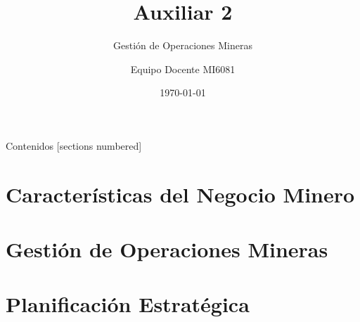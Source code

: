 \documentclass[10pt]{beamer}
\title{Auxiliar 2}
\subtitle{Gestión de Operaciones Mineras}
\date{\today}
\author{Equipo Docente MI6081}
\institute{Universidad de Chile - FCFM}
\begin{document}
\maketitle

\begin{frame}[allowframebreaks]{Contenidos}
  [sections numbered]
  \tableofcontents[hideallsubsections]
\end{frame}

\section{Características del Negocio Minero}

\section{Gestión de Operaciones Mineras}

\section{Planificación Estratégica}
\end{document}

